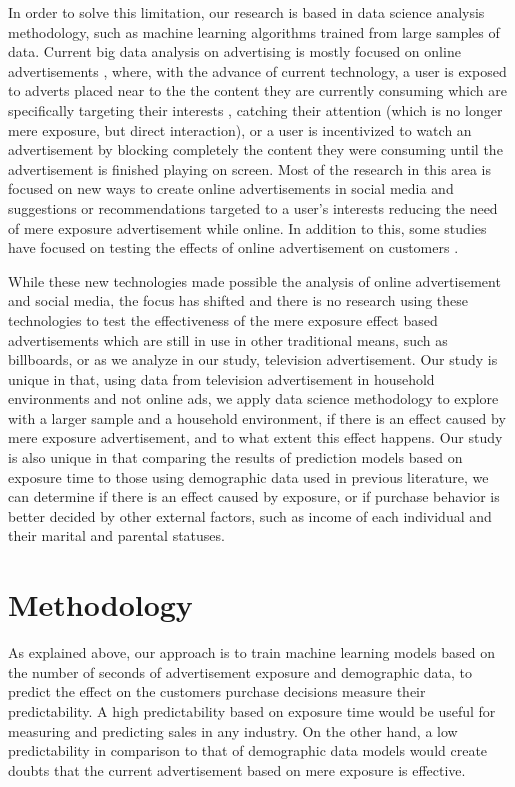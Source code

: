 \documentclass[review]{elsarticle}
\begin{document}
In order to solve this limitation, our research is based in data science analysis methodology, such as machine learning algorithms trained from large samples of data. Current big data analysis on advertising is mostly focused on online advertisements \cite{wu, stitelman}, where, with the advance of current technology, a user is exposed to adverts placed near to the the content they are currently consuming which are specifically targeting their interests \cite{perlich,schwartz}, catching their attention (which is no longer mere exposure, but direct interaction), or a user is incentivized to watch an advertisement by blocking completely the content they were consuming until the advertisement is finished playing on screen. Most of the research in this area is focused on new ways to create online advertisements in social media \cite{shareef-mb} and suggestions or recommendations targeted to a user's interests \cite[e.g.][]{jansen,zhang,kannan,choi} reducing the need of mere exposure advertisement while online. In addition to this, some studies have focused on testing the effects of online advertisement on customers \cite{alawan,lee-j,shareef-mc}.

While these new technologies made possible the analysis of online advertisement and social media, the focus has shifted and there is no research using these technologies to test the effectiveness of the mere exposure effect based advertisements which are still in use in other traditional means, such as billboards, or as we analyze in our study, television advertisement. Our study is unique in that, using data from television advertisement in household environments and not online ads, we apply data science methodology to explore with a larger sample and a household environment, if there is an effect caused by mere exposure advertisement, and to what extent this effect happens. Our study is also unique in that comparing the results of prediction models based on exposure time to those using demographic data used in previous literature, we can determine if there is an effect caused by exposure, or if purchase behavior is better decided by other external factors, such as income of each individual and their marital and parental statuses.

\section{Methodology}
\label{method}

As explained above, our approach is to train machine learning models based on the number of seconds of advertisement exposure and demographic data, to predict the effect on the customers purchase decisions measure their predictability. A high predictability based on exposure time would be useful for measuring and predicting sales in any industry. On the other hand, a low predictability in comparison to that of demographic data models would create doubts that the current advertisement based on mere exposure is effective.
\end{document}
